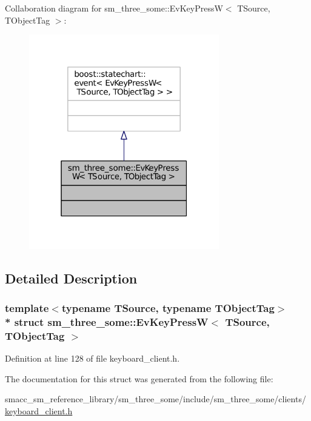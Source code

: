 Collaboration diagram for sm\+\_\+three\+\_\+some\+:\+:Ev\+Key\+PressW$<$ T\+Source, T\+Object\+Tag $>$\+:
\nopagebreak
\begin{figure}[H]
\begin{center}
\leavevmode
\includegraphics[width=235pt]{structsm__three__some_1_1EvKeyPressW__coll__graph}
\end{center}
\end{figure}


\subsection{Detailed Description}
\subsubsection*{template$<$typename T\+Source, typename T\+Object\+Tag$>$\\*
struct sm\+\_\+three\+\_\+some\+::\+Ev\+Key\+Press\+W$<$ T\+Source, T\+Object\+Tag $>$}



Definition at line 128 of file keyboard\+\_\+client.\+h.



The documentation for this struct was generated from the following file\+:\begin{DoxyCompactItemize}
\item 
smacc\+\_\+sm\+\_\+reference\+\_\+library/sm\+\_\+three\+\_\+some/include/sm\+\_\+three\+\_\+some/clients/\hyperlink{keyboard__client_8h}{keyboard\+\_\+client.\+h}\end{DoxyCompactItemize}
